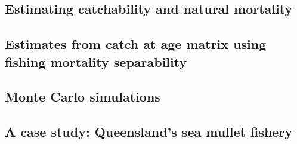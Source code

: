 \documentclass{nrc2}
\begin{document}
\subsection{Estimating catchability and natural mortality}
           

\subsection{Estimates from catch at age matrix using fishing mortality separability}
           

\subsection{Monte Carlo simulations}
           

\subsection{A case study: Queensland's sea mullet fishery}
           




%
%
\end{document}

